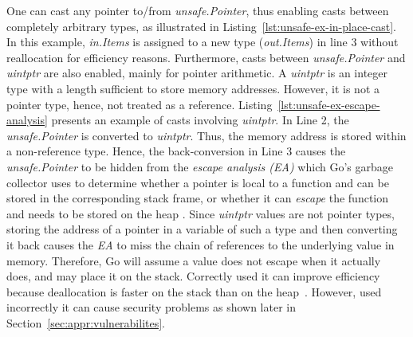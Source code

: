 One can cast any pointer to/from \textit{unsafe.Pointer}, thus enabling casts between completely arbitrary types, as illustrated in  
%
Listing~\ref{lst:unsafe-ex-in-place-cast}.
In this example, \textit{in.Items} is assigned to a new type (\textit{out.Items}) in line 3 without reallocation for efficiency reasons. %
Furthermore, casts between \textit{unsafe.Pointer} and \textit{uintptr} are also enabled, mainly for pointer arithmetic.
A \textit{uintptr} is an integer type with a length sufficient to store memory addresses. 
However, it is not a pointer type, hence, not treated as a reference.
%
Listing~\ref{lst:unsafe-ex-escape-analysis} presents an example of casts involving \textit{uintptr}. 
In Line 2, the \textit{unsafe.Pointer} is converted to \textit{uintptr}.
Thus, the memory address is stored within a non-reference type.
Hence, the back-conversion in Line 3 causes the \textit{unsafe.Pointer} to be hidden from the \textit{escape analysis (EA)} which Go's garbage collector uses 
to determine whether a pointer is local to a function and can be stored in the corresponding stack frame, 
or whether it can \textit{escape} the function and needs to be stored on the heap \cite{wang2020}. 
Since \textit{uintptr} values are not pointer types, storing the address of a pointer in a variable of such a type and then converting it back causes the \textit{EA} to miss the chain of references to the underlying value in memory. 
Therefore, Go will assume a value does not escape when it actually does, and may place it on the stack.
Correctly used it can improve efficiency because deallocation is faster on the stack than on the heap~\cite{wang2020}.
However, used incorrectly it can cause security problems as shown later in Section~\ref{sec:appr:vulnerabilites}.

